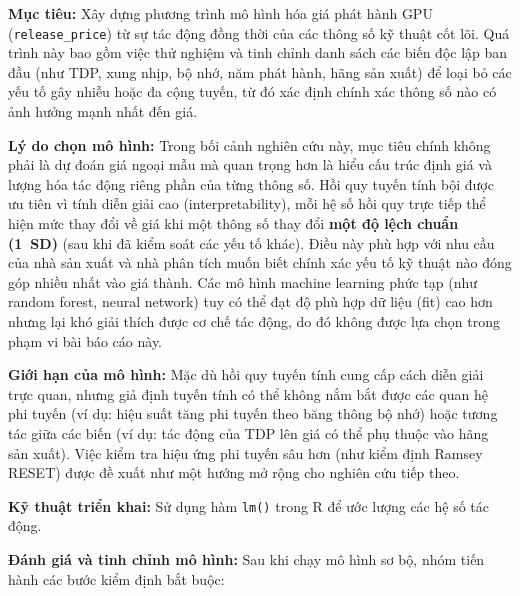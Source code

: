 \documentclass[12pt,a4paper]{article}
\begin{document}
\textbf{Mục tiêu:} Xây dựng phương trình mô hình hóa giá phát hành GPU
(\texttt{release\_price}) từ sự tác động đồng thời của các thông số kỹ thuật cốt lõi.
Quá trình này bao gồm việc thử nghiệm và tinh chỉnh danh sách các biến độc lập ban đầu
(như TDP, xung nhịp, bộ nhớ, năm phát hành, hãng sản xuất) để loại bỏ các yếu tố gây
nhiễu hoặc đa cộng tuyến, từ đó xác định chính xác thông số nào có ảnh hưởng mạnh nhất
đến giá.

\textbf{Lý do chọn mô hình:} Trong bối cảnh nghiên cứu này, mục tiêu chính không phải là
dự đoán giá ngoại mẫu mà quan trọng hơn là hiểu cấu trúc định giá và lượng hóa tác động
riêng phần của từng thông số. Hồi quy tuyến tính bội được ưu tiên vì tính diễn giải cao
(interpretability), mỗi hệ số hồi quy trực tiếp thể hiện mức thay đổi về giá khi một
thông số thay đổi \textbf{một độ lệch chuẩn (1~SD)} (sau khi đã kiểm soát các yếu tố
khác). Điều này phù hợp với nhu cầu của nhà sản xuất và nhà phân tích muốn biết chính xác
yếu tố kỹ thuật nào đóng góp nhiều nhất vào giá thành. Các mô hình machine learning phức
tạp (như random forest, neural network) tuy có thể đạt độ phù hợp dữ liệu (fit) cao hơn
nhưng lại khó giải thích được cơ chế tác động, do đó không được lựa chọn trong phạm vi
bài báo cáo này.

\textbf{Giới hạn của mô hình:} Mặc dù hồi quy tuyến tính cung cấp cách diễn giải trực
quan, nhưng giả định tuyến tính có thể không nắm bắt được các quan hệ phi tuyến (ví dụ:
hiệu suất tăng phi tuyến theo băng thông bộ nhớ) hoặc tương tác giữa các biến (ví dụ:
tác động của TDP lên giá có thể phụ thuộc vào hãng sản xuất). Việc kiểm tra hiệu ứng phi
tuyến sâu hơn (như kiểm định Ramsey RESET) được đề xuất như một hướng mở rộng cho nghiên
cứu tiếp theo.

\textbf{Kỹ thuật triển khai:} Sử dụng hàm \texttt{lm()} trong R để ước lượng các hệ số
tác động.

\textbf{Đánh giá và tinh chỉnh mô hình:} Sau khi chạy mô hình sơ bộ, nhóm tiến hành các
bước kiểm định bắt buộc:
\end{document}
